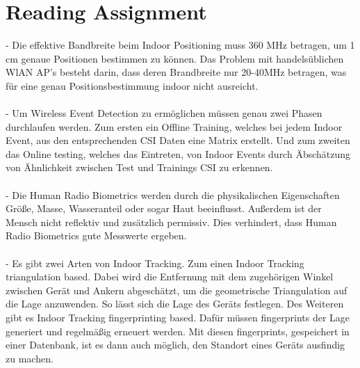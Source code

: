 \documentclass[12pt,a4paper]{article}
\begin{document}
\section{Reading Assignment}
- Die effektive Bandbreite beim Indoor Positioning muss 360 MHz betragen, um 1 cm genaue Positionen bestimmen zu können. Das Problem mit handelsüblichen WlAN AP's besteht darin, dass deren Brandbreite nur 20-40MHz betragen, was für eine genau Positionsbestimmung indoor nicht ausreicht.\\\\
- Um Wireless Event Detection zu ermöglichen müssen genau zwei Phasen durchlaufen werden. Zum ersten ein Offline Training, welches bei jedem Indoor Event, aus den entsprechenden CSI Daten eine Matrix erstellt. Und zum zweiten das Online testing, welches das Eintreten, von Indoor Events durch Äbschätzung von Ähnlichkeit zwischen Test und Trainings CSI zu erkennen.\\\\
- Die Human Radio Biometrics werden durch die physikalischen Eigenschaften Größe, Masse, Wasseranteil oder sogar Haut beeinflusst. Außerdem ist der Mensch nicht reflektiv und zusätzlich permissiv. Dies verhindert, dass Human Radio Biometrics gute Messwerte ergeben. \\\\
- Es gibt zwei Arten von Indoor Tracking. Zum einen Indoor Tracking triangulation based. Dabei wird die Entfernung mit dem zugehörigen Winkel zwischen Gerät und Ankern abgeschätzt, um die geometrische Triangulation auf die Lage anzuwenden. So lässt sich die Lage des Geräts festlegen. Des Weiteren gibt es Indoor Tracking fingerprinting based. Dafür müssen fingerprints der Lage generiert und regelmäßig erneuert werden. Mit diesen fingerprints, gespeichert in einer Datenbank, ist es dann auch möglich, den Standort eines Geräts ausfindig zu machen.
\end{document}

